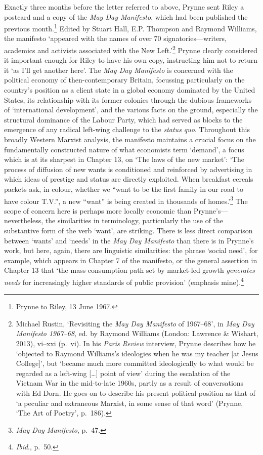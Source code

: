 \documentclass[]{article}
\begin{document}
Exactly three months before the letter referred to above, Prynne sent
Riley a postcard and a copy of the \emph{May Day Manifesto}, which had
been published the previous month.\footnote{Prynne to Riley, 13 June
  1967.} Edited by Stuart Hall, E.P. Thompson and Raymond Williams, the
manifesto ‘appeared with the names of over 70 signatories—writers,
academics and activists associated with the New Left.’\footnote{Michael
  Rustin, ‘Revisiting the \emph{May Day Manifesto} of 1967–68’, in
  \emph{May Day Manifesto 1967–68}, ed. by Raymond Williams (London:
  Lawrence \& Wishart, 2013), vi–xxi (p.~vi). In his \emph{Paris Review}
  interview, Prynne describes how he ‘objected to Raymond Williams’s
  ideologies when he was my teacher {[}at Jesus College{]}’, but ‘became
  much more committed ideologically to what would be regarded as a
  left-wing {[}\ldots{}{]} point of view’ during the escalation of the
  Vietnam War in the mid-to-late 1960s, partly as a result of
  conversations with Ed Dorn. He goes on to describe his present
  political position as that of ‘a peculiar and extraneous Marxist, in
  some sense of that word’ (Prynne, ‘The Art of Poetry’, p.~186).}
Prynne clearly considered it important enough for Riley to have his own
copy, instructing him not to return it ‘as I’ll get another here’. The
\emph{May Day Manifesto} is concerned with the political economy of
then-contemporary Britain, focussing particularly on the country’s
position as a client state in a global economy dominated by the United
States, its relationship with its former colonies through the dubious
frameworks of ‘international development’, and the various facts on the
ground, especially the structural dominance of the Labour Party, which
had served as blocks to the emergence of any radical left-wing challenge
to the \emph{status quo}. Throughout this broadly Western Marxist
analysis, the manifesto maintains a crucial focus on the fundamentally
constructed nature of what economists term ‘demand’, a focus which is at
its sharpest in Chapter 13, on ‘The laws of the new market’: ‘The
process of diffusion of new wants is conditioned and reinforced by
advertising in which ideas of prestige and status are directly
exploited. When breakfast cereals packets ask, in colour, whether we
“want to be the first family in our road to have colour T.V.”, a new
“want” is being created in thousands of homes.’\footnote{\emph{May Day
  Manifesto}, p.~47.} The scope of concern here is perhaps more locally
economic than Prynne’s—nevertheless, the similarities in terminology,
particularly the use of the substantive form of the verb ‘want’, are
striking. There is less direct comparison between ‘wants’ and ‘needs’ in
the \emph{May Day Manifesto} than there is in Prynne’s work, but here,
again, there are linguistic similarities: the phrase ‘social need’, for
example, which appears in Chapter 7 of the manifesto, or the general
assertion in Chapter 13 that ‘the mass consumption path set by
market-led growth \emph{generates needs} for increasingly higher
standards of public provision’ (emphasis mine).\footnote{\emph{Ibid}.,
  p.~50.}
\end{document}
